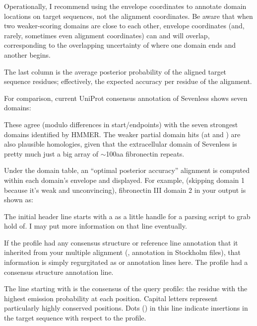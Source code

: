 Operationally, I recommend using the envelope coordinates to annotate
domain locations on target sequences, not the alignment
coordinates. Be aware that when two weaker-scoring domains are close
to each other, envelope coordinates (and, rarely, sometimes even
alignment coordinates) can and will overlap, corresponding to the
overlapping uncertainty of where one domain ends and another begins.

The last column is the average posterior probability of the aligned
target sequence residues; effectively, the expected accuracy per
residue of the alignment.

For comparison, current UniProt consensus annotation of Sevenless
shows seven domains:


These agree (modulo differences in start/endpoints) with the seven
strongest domains identified by HMMER. The weaker partial domain hits
(at \SFSacoords{} and \SFSbcoords{}) are also plausible homologies, given that
the extracellular domain of Sevenless is pretty much just a big array
of $\sim$100aa fibronectin repeats.

Under the domain table, an ``optimal posterior accuracy''
alignment\cite{Holmes98} is computed within each domain's envelope
and displayed. For example, (skipping domain 1 because it's weak and
unconvincing), fibronectin III domain 2 in your 
output is shown as:


The initial header line starts with a \mono{==} as a little handle for
a parsing script to grab hold of. I may put more information on that line
eventually.

If the profile had any consensus structure or reference line annotation
that it inherited from your multiple alignment (,
 annotation in Stockholm files), that information is
simply regurgitated as  or  annotation lines
here. The  profile had a consensus structure annotation line.

The line starting with  is the consensus of the query
profile: the residue with the highest emission probability at each
position. Capital letters represent particularly
highly conserved positions.
Dots () in this line indicate insertions
in the target sequence with respect to the profile.

